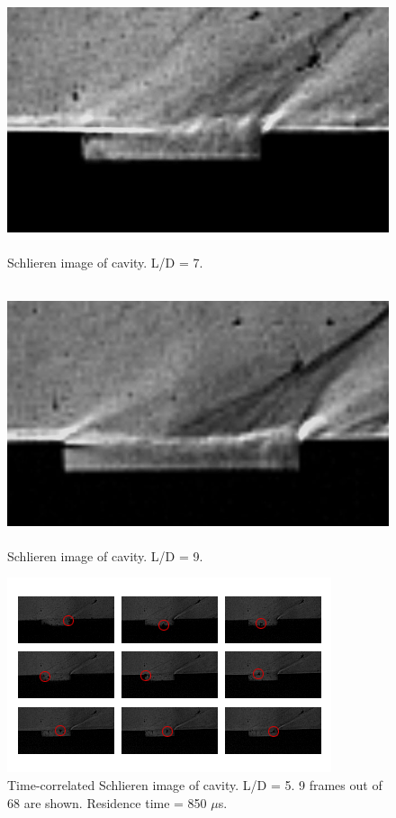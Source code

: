 \begin{figure}
\centering
\includegraphics[height = 3in]{Figures/7.jpg}
\caption[Schlieren image of cavity. L/D = 7.]{Schlieren image of cavity. L/D = 7.}
\label{fig:7}
\end{figure}

\begin{figure}
\centering
\includegraphics[height = 3in]{Figures/9.jpg}
\caption[Schlieren image of cavity. L/D = 9.]{Schlieren image of cavity. L/D = 9.}
\label{fig:9}
\end{figure}

\begin{figure}[p!]
\centering
\includegraphics[width = \textwidth]{Figures/cavResTime.jpg}
\caption[Time-correlated Schlieren image of cavity. L/D = 5.]{Time-correlated Schlieren image of cavity. L/D = 5. 9 frames out of 68 are shown. Residence time = 850 $\mu$s.}
\label{fig:ResTime}
\end{figure}
\clearpage

